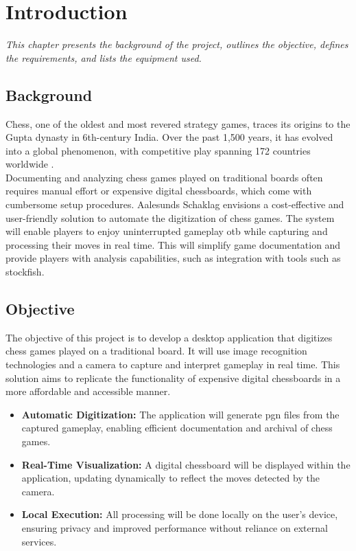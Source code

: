 \chapter{Introduction}

\begin{center} 
\textit{This chapter presents the background of the project, outlines the objective, defines the requirements, and lists the equipment used.}
\end{center}

\section{Background}

Chess, one of the oldest and most revered strategy games, traces its origins to the Gupta dynasty in 6th-century India. Over the past 1,500 years, it has evolved into a global phenomenon, with competitive play spanning 172 countries worldwide \cite{artsnculture}. \\

Documenting and analyzing chess games played on traditional boards often requires manual effort or expensive digital chessboards, which come with cumbersome setup procedures. Aalesunds Schaklag envisions a cost-effective and user-friendly solution to automate the digitization of chess games.  The system will enable players to enjoy uninterrupted gameplay \gls{otb} while capturing and processing their moves in real time. This will simplify game documentation and provide players with analysis capabilities, such as integration with tools such as \gls{stockfish}.

\newpage

\section{Objective}

The objective of this project is to develop a desktop application that digitizes chess games played on a traditional board. It will use image recognition technologies and a camera to capture and interpret gameplay in real time. This solution aims to replicate the functionality of expensive digital chessboards in a more affordable and accessible manner.

\begin{itemize}
    \item \textbf{Automatic Digitization:} The application will generate \gls{pgn} files from the captured gameplay, enabling efficient documentation and archival of chess games.

    \item \textbf{Real-Time Visualization:} A digital chessboard will be displayed within the application, updating dynamically to reflect the moves detected by the camera.

    \item \textbf{Local Execution:} All processing will be done locally on the user’s device, ensuring privacy and improved performance without reliance on external
    services.
\end{itemize}

